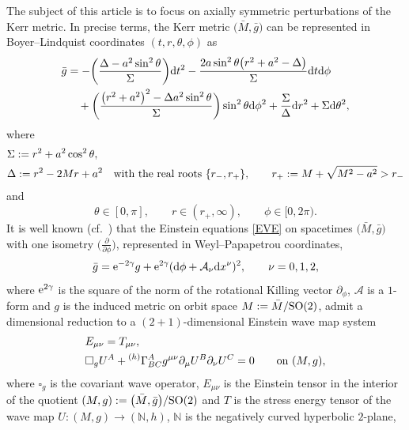 \documentclass[11pt]{article}
\numberwithin{equation}{section}
\def\ptl{\partial}%
\newcommand{\leftexp}[2]{{\vphantom{#2}}^{#1}{#2}}
\numberwithin{equation}{section}
\begin{document}
\setcounter{equation}{4}
The subject of this article is to focus on axially symmetric perturbations of the Kerr metric. In precise terms, the Kerr metric $\bigl(\bar{M}, \bar{g}\bigr)$ can be represented in Boyer--Lindquist coordinates $(t, r, \theta, \phi)$ as
\begin{align}
\bar{g} &{}= - \biggl(\frac{\Delta - a^2 \sin^2 \theta}{\Sigma} \biggr) {\rm d}t^2 - \frac{2a \sin^2 \theta \bigl(r^2 + a^2 -\Delta\bigr)}{\Sigma} {\rm d}t {\rm d}\phi \notag\\
&\quad{}+ \biggl(\frac{\bigl(r^2 +a^2\bigr)^2 -\Delta a^2 \sin^2 \theta}{\Sigma}\biggr) \sin^2 \theta {\rm d}\phi^2 + \frac{\Sigma}{\Delta} {\rm d}r^2 + \Sigma {\rm d}\theta^2, \label{BL-Kerr}
\end{align}
where
\begin{align*}
&\Sigma := r^2 + a^2 \cos^2 \theta, \\
&\Delta := r^2 -2Mr + a^2 \quad \textnormal{with the real roots} \ \{r_-,r_+\}, \qquad
 r_{+} := M + \sqrt{M^2- a^2} > r_{-}
\end{align*}
and
\[
\theta \in [0, \pi],\qquad r \in (r_+, \infty),\qquad \phi \in [0, 2\pi).
\]
It is well known (cf.\ \cite{YCB-VM96, Ycb-Mon_01, diss_13}) that the Einstein equations \eqref{EVE} on spacetimes $\bigl(\bar{M}, \bar{g}\bigr)$ with one isometry $\bigl(\frac{\ptl}{\ptl \phi}\bigr)$, represented in Weyl--Papapetrou coordinates,
\begin{align*}
\bar{g} = {\rm e}^{-2\gamma} g + {\rm e}^{2\gamma} ({\rm d}\phi + \mathcal{A}_\nu {\rm d}x^\nu)^2, \qquad \nu= 0, 1, 2,
\end{align*}
where ${\rm e}^{2 \gamma}$ is the square of the norm of the rotational Killing vector $\ptl_\phi$, $\mathcal{A}$ is a $1$-form and $g$ is the induced metric on orbit space $M := \bar{M}/{\rm SO}(2)$, admit a dimensional reduction to a $(2 + 1)$-dimensional Einstein wave map system
\begin{subequations} \label{ewm-system}
\begin{align}
&E_{\mu \nu} = T_{\mu \nu}, \\
&\square_g U^A + \leftexp{(h)}{\Gamma}^A_{BC} g^{\mu \nu} \ptl_\mu U^B \ptl_\nu U^C= 0 \qquad \text{on} \ (M, g),
\end{align}
\end{subequations}
where $\square_g$ is the covariant wave operator, $E_{\mu \nu}$ is the Einstein tensor in the interior of the quotient $(M, g) := \bigl(\bar{M}, \bar{g}\bigr)/ {\rm SO}(2)$ and $T$ is the stress energy tensor of the wave map $U \colon (M, g) \to (\mathbb{N}, h)$, $\mathbb{N}$ is the negatively curved hyperbolic $2$-plane,
\end{document}
